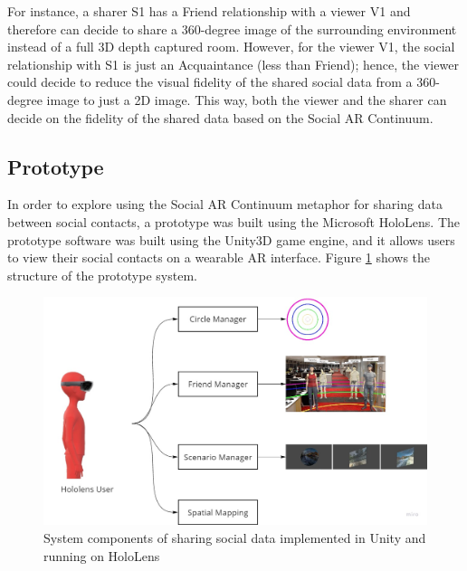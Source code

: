
For instance, a sharer S1 has a Friend relationship with a viewer V1 and therefore can decide to share a 360-degree image of the surrounding environment instead of a full 3D depth captured room. However, for the viewer V1, the social relationship with S1 is just an Acquaintance (less than Friend); hence, the viewer could decide to reduce the visual fidelity of the shared social data from a 360-degree image to just a 2D image. This way, both the viewer and the sharer can decide on the fidelity of the shared data based on the Social AR Continuum.  

\subsection{Prototype}

In order to explore using the Social AR Continuum metaphor for sharing data between social contacts, a prototype was built using the Microsoft HoloLens. The prototype software was built using the Unity3D game engine, and it allows users to view their social contacts on a wearable AR interface. Figure \ref{fig:data:system} shows the structure of the prototype system. 

\begin{figure}[ht]
    \centering
    \includegraphics[width=\linewidth]{images/52-data-chi/chi18-system.jpg}
    \caption{System components of sharing social data implemented in Unity and running on HoloLens}
    \label{fig:data:system}
\end{figure}

